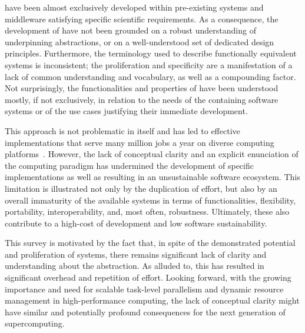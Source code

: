 \documentclass{sig-alternate}
\begin{document}



\pilotjobs have been almost exclusively developed within pre-existing systems
and middleware satisfying specific scientific requirements. As a consequence,
the development of \pilotjobs have not been grounded on a robust understanding
of underpinning abstractions, or on a well-understood set of dedicated design
principles. Furthermore, the terminology used to describe functionally
equivalent systems is inconsistent; the proliferation and specificity are a
manifestation of a lack of common understanding and vocabulary, as well as a
compounding factor.  Not surprisingly, the functionalities and properties of
\pilotjobs have been understood mostly, if not exclusively, in relation to the
needs of the containing software systems or of the use cases justifying their
immediate development.

This approach is not problematic in itself and has led to effective
implementations that serve many million jobs a year on diverse computing
platforms~\cite{maeno2014evolution,katz2012}. However, the lack of conceptual
clarity and an explicit enunciation of the \pilotjob computing paradigm has
undermined the development of specific implementations as well as resulting in
an unsustainable software ecosystem. This limitation is illustrated not only by
the duplication of effort, but also by an overall immaturity of the available
systems in terms of functionalities, flexibility, portability, interoperability,
and, most often, robustness. Ultimately, these also contribute to a high-cost of
development and low software sustainability.

This survey is motivated by the fact that, in spite of the demonstrated
potential and proliferation of \pilotjob systems, there remains significant lack
of clarity and understanding about the \pilotjob abstraction. As alluded to,
this has resulted in significant overhead and repetition of effort. Looking
forward, with the growing importance and need for scalable task-level
parallelism and dynamic resource management in high-performance computing, the
lack of conceptual clarity might have similar and potentially profound
consequences for the next generation of supercomputing.
\end{document}
